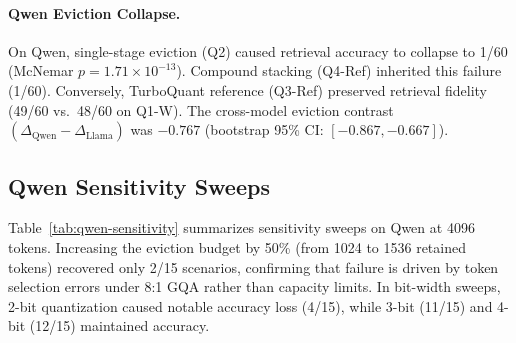 \documentclass[sigconf,nonacm]{acmart}
\begin{document}
\paragraph{Qwen Eviction Collapse.}
On Qwen, single-stage eviction (Q2) caused retrieval accuracy to collapse to 1/60 (McNemar $p = 1.71 \times 10^{-13}$). Compound stacking (Q4-Ref) inherited this failure (1/60). Conversely, TurboQuant reference (Q3-Ref) preserved retrieval fidelity (49/60 vs.\ 48/60 on Q1-W). The cross-model eviction contrast $(\Delta_{\text{Qwen}} - \Delta_{\text{Llama}})$ was $-0.767$ (bootstrap 95\% CI: $[-0.867, -0.667]$).

\subsection{Qwen Sensitivity Sweeps}
Table~\ref{tab:qwen-sensitivity} summarizes sensitivity sweeps on Qwen at 4096 tokens. Increasing the eviction budget by 50\% (from 1024 to 1536 retained tokens) recovered only 2/15 scenarios, confirming that failure is driven by token selection errors under 8:1 GQA rather than capacity limits. In bit-width sweeps, 2-bit quantization caused notable accuracy loss (4/15), while 3-bit (11/15) and 4-bit (12/15) maintained accuracy.

\begin{table}[t]
\caption{Qwen Sensitivity Sweeps at 4096 Tokens (15 Common Test Scenarios)}
\label{tab:qwen-sensitivity}
\centering\small
\setlength{\tabcolsep}{4.5pt}
\end{table}
\end{document}
